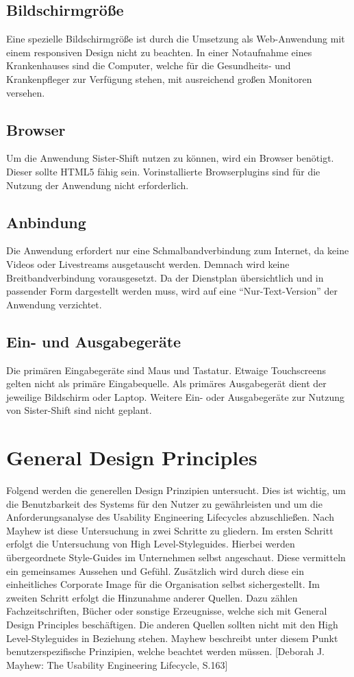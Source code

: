 \documentclass[11pt,
paper=a4,
bibtotocnumbered,	  %
liststotocnumbered,  %
DIV=calc,		  %
tablecaptionabove,	  %
headinclude,
]{article}
\begin{document}
\subsection{Bildschirmgröße}
Eine spezielle Bildschirmgröße ist durch die Umsetzung als Web-Anwendung mit einem responsiven Design nicht zu beachten. In einer Notaufnahme eines Krankenhauses sind die Computer, welche für die Gesundheits- und Krankenpfleger zur Verfügung stehen, mit ausreichend großen Monitoren 
versehen.
\subsection{Browser}
Um die Anwendung Sister-Shift nutzen zu können, wird ein Browser benötigt. Dieser sollte HTML5 fähig sein. Vorinstallierte Browserplugins sind für die Nutzung der Anwendung nicht erforderlich.
\subsection{Anbindung}
Die Anwendung erfordert nur eine Schmalbandverbindung zum Internet, da keine Videos oder Livestreams ausgetauscht werden. Demnach wird keine Breitbandverbindung vorausgesetzt. Da der Dienstplan übersichtlich und in passender Form dargestellt werden muss, wird auf eine “Nur-Text-Version” der Anwendung verzichtet.
\subsection{Ein- und Ausgabegeräte}
Die primären Eingabegeräte sind Maus und Tastatur. Etwaige Touchscreens gelten nicht als primäre Eingabequelle. Als primäres Ausgabegerät dient der jeweilige Bildschirm oder Laptop. Weitere Ein- oder Ausgabegeräte zur Nutzung von Sister-Shift sind nicht geplant.
\section{General Design Principles}
Folgend werden die generellen Design Prinzipien untersucht. Dies ist wichtig, um die Benutzbarkeit des Systems für den Nutzer zu gewährleisten und um die Anforderungsanalyse des Usability Engineering Lifecycles abzuschließen. Nach Mayhew ist diese Untersuchung in zwei Schritte zu gliedern. 
Im ersten Schritt erfolgt die Untersuchung von High Level-Styleguides. Hierbei werden übergeordnete Style-Guides im Unternehmen selbst angeschaut. Diese vermitteln ein gemeinsames Aussehen und Gefühl. Zusätzlich wird durch diese ein einheitliches Corporate Image für die Organisation selbst sichergestellt.
Im zweiten Schritt erfolgt die Hinzunahme anderer Quellen. Dazu zählen Fachzeitschriften, Bücher oder sonstige Erzeugnisse, welche sich mit General Design Principles beschäftigen. Die anderen Quellen sollten nicht mit den High Level-Styleguides in Beziehung stehen. Mayhew beschreibt unter diesem Punkt benutzerspezifische Prinzipien, welche beachtet werden müssen. [Deborah J. Mayhew: The Usability Engineering Lifecycle, S.163]
\end{document}
